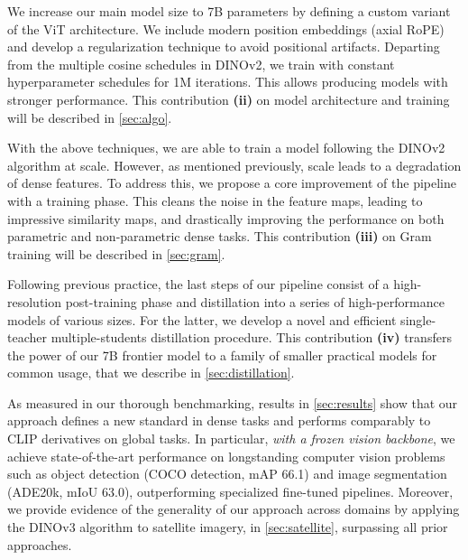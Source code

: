 We increase our main model size to 7B parameters by defining a custom variant of the ViT architecture.
We include modern position embeddings (axial RoPE) and develop a regularization technique to avoid positional artifacts. 
Departing from the multiple cosine schedules in DINOv2, we train with constant hyperparameter schedules for 1M iterations. 
This allows producing models with stronger performance. 
This contribution \textbf{(ii)} on model architecture and training will be described in \cref{sec:algo}.

With the above techniques, we are able to train a model following the DINOv2 algorithm at scale. 
However, as mentioned previously, scale leads to a degradation of dense features. 
To address this, we propose a core improvement of the pipeline with a \gramname training phase. 
This cleans the noise in the feature maps, leading to impressive similarity maps, and drastically improving the performance on both parametric and non-parametric dense tasks. 
This contribution \textbf{(iii)} on Gram training will be described in \cref{sec:gram}.

Following previous practice, the last steps of our pipeline consist of a high-resolution post-training phase and distillation into a series of high-performance models of various sizes.
For the latter, we develop a novel and efficient single-teacher multiple-students distillation procedure. 
This contribution \textbf{(iv)} transfers the power of our 7B frontier model to a family of smaller practical models for common usage, that we describe in \cref{sec:distillation}.

As measured in our thorough benchmarking, results in \cref{sec:results} show that our approach defines a new standard in dense tasks and performs comparably to CLIP derivatives on global tasks. 
In particular, \textit{with a frozen vision backbone}, we achieve state-of-the-art performance on longstanding computer vision problems such as object detection (COCO detection, mAP 66.1) and image segmentation (ADE20k, mIoU 63.0), outperforming specialized fine-tuned pipelines. 
Moreover, we provide evidence of the generality of our approach across domains by applying the DINOv3 algorithm to satellite imagery, in \cref{sec:satellite}, surpassing all prior approaches. 
